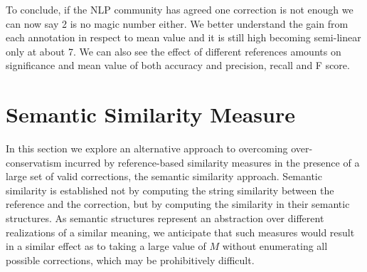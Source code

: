 \documentclass[letter,11pt]{article}
\newcommand{\com}[1]{}
\newcommand{\lc}[1]{\footnote{\color{green}LC: #1}}
\begin{document}
		\com{\lc{I think this can be omitted}
			So, why is significance more complicated? Basically, because variance is more complex than mean. While $\mathbb{E}_{y\sim d_x, x\sim L}\left(\hat{S}\right)$ vary only as we change $M$
			the number of annotations, but not $N$ the number of corrections,
			$Var_{y\sim d_x, x\sim L}(\hat{S})$ depends on both. We try to assess and give an upper
			bound on how much it varies for different $M$ and $N$, allowing
			for both a smart allocation of resources when building a corpus and for assessing on given corpora whether two correctors are actually different.
		}
		
		To conclude, if the NLP community has agreed one correction is not enough\cite{tetreault2008native}
		we can now say 2 is no magic number either. We better understand the gain from each annotation in respect to mean value and it is still high becoming semi-linear only at about 7. We can also see the effect of different references amounts on significance and mean value of both accuracy and precision, recall and F score.
		
		
		\section{Semantic Similarity Measure}\label{sec:Semantics}
		
		
		
		In this section we explore an alternative approach to overcoming over-conservatism
		incurred by reference-based similarity measures in the presence of a large set of
		valid corrections, the semantic similarity approach.
		Semantic similarity is established not by computing the string similarity between
		the reference and the correction, but by computing the similarity in their semantic
		structures. As semantic structures represent an abstraction over different realizations
		of a similar meaning, we anticipate that such measures would result in a similar
		effect as to taking a large value of $M$ without enumerating all possible corrections,
		which may be prohibitively difficult.
		
\end{document}

